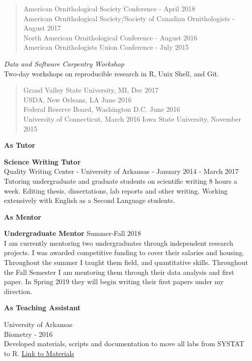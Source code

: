 \documentclass[]{article}
\begin{document}
\begin{quote}
American Ornithological Society Conference - April 2018\\
American Ornithological Society/Society of Canadian Ornithologists -
August 2017\\
North American Ornithological Conference - August 2016\\
American Ornithologists Union Conference - July 2015
\end{quote}

\emph{Data and Software Carpentry Workshop}\\
Two-day workshops on reproducible research in R, Unix Shell, and Git.

\begin{quote}
Grand Valley State University, MI, Dec 2017\\
USDA, New Orleans, LA June 2016\\
Federal Reserve Board, Washington D.C. June 2016\\
University of Connecticut, March 2016 Iowa State University, November
2015
\end{quote}

\textbf{As Tutor}

\textbf{Science Writing Tutor}\\
Quality Writing Center - University of Arkansas - January 2014 - March
2017 Tutoring undergraduate and graduate students on scientific writing
8 hours a week. Editing thesis, dissertations, lab reports and other
writing. Working extensively with English as a Second Language students.

\textbf{As Mentor}

\textbf{Undergraduate Mentor} Summer-Fall 2018\\
I am currently mentoring two undergraduates through independent research
projects. I was awarded competitive funding to cover their salaries and
housing. Throughout the summer I taught them field, and quantitative
skills. Throughout the Fall Semester I am mentoring them through their
data analysis and first paper. In Spring 2019 they will begin writing
their first papers under my direction.

\textbf{As Teaching Assistant}

University of Arkansas\\
Biometry - 2016\\
Developed materials, scripts and documentation to move all labs from
SYSTAT to R.
\href{https://github.com/aurielfournier/Biometry_Materials}{Link to
Materials}
\end{document}
